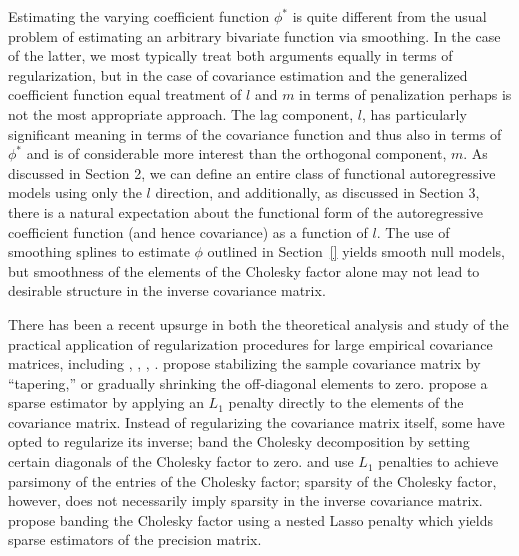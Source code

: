 \documentclass[12pt]{article}
\theoremstyle{definition}
\begin{document}

Estimating the varying coefficient function $\phi^*$ is quite different from the usual problem of estimating an arbitrary bivariate function via smoothing. In the case of the latter, we most typically treat both arguments equally in terms of regularization, but in the case of covariance estimation and the generalized coefficient function equal treatment of $l$ and $m$ in terms of penalization perhaps is not the most appropriate approach. The lag component, $l$, has particularly significant meaning in terms of the covariance function and thus also in terms of $\phi^*$ and is of considerable more interest than the orthogonal component, $m$. As discussed in Section 2, we can define an entire class of functional autoregressive models using only the $l$ direction, and additionally, as discussed in Section 3, there is a natural expectation about the functional form of the autoregressive coefficient function (and hence covariance) as a function of $l$. The use of smoothing splines to estimate $\phi$ outlined in Section~\ref{} yields smooth null models, but smoothness of the elements of the Cholesky factor alone may not lead to desirable structure in the inverse covariance matrix.  

There has been a recent upsurge in both the theoretical analysis and study of the practical application of regularization procedures for large empirical covariance matrices, including \citet{huang2006covariance}, \citet{furrer2007estimation}, \citet{fan2008high}, \citet{ledoit2004well}.  \citet{furrer2007estimation} propose stabilizing the sample covariance matrix by ``tapering,'' or gradually shrinking the off-diagonal elements to zero. \citet{d2008first} propose a sparse estimator by applying an $L_1$ penalty directly to the elements of the covariance matrix. Instead of regularizing the covariance matrix itself, some have opted to regularize its inverse;  \cite{wu2003nonparametric} band the Cholesky decomposition  by setting certain diagonals of the Cholesky factor to zero. \citet{huang2006covariance} and \citet{levina2008sparse} use $L_1$ penalties to achieve parsimony of the entries of the Cholesky factor; sparsity of the Cholesky factor, however, does not necessarily imply sparsity in the inverse covariance matrix. \citet{levina2008sparse} propose banding the Cholesky factor using a nested Lasso penalty which yields sparse estimators of the precision matrix.  
\end{document}
